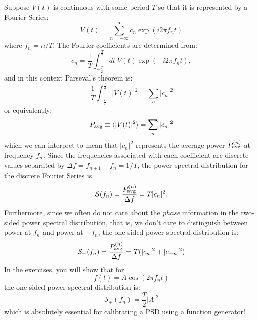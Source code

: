 \documentclass[12pt]{article}
\begin{document}
Suppose $V(t)$ is continuous with some period $T$ so that it is represented by a Fourier Series:
\begin{displaymath}
V(t) = \sum_{n=-\infty}^{\infty} c_n \exp(i2\pi f_n t)
\end{displaymath}
where $f_n = n / T$.  The Fourier coefficients are determined from:
\begin{equation}
c_n = \frac{1}{T} \int_{-\frac{T}{2}}^{\frac{T}{2}} dt \; V(t) \exp(-i2\pi f_n t), \label{eqn:freqcoeff}
\end{equation}
and in this context Parseval's theorem is:
\begin{displaymath}
\frac{1}{T} \int_{-\frac{T}{2}}^{\frac{T}{2}} |V(t)|^2 = \sum_n |c_n|^2
\end{displaymath}
or equivalently:
\begin{displaymath}
P_{\rm avg} \equiv \braket{|V(t)|^2} = \sum_n |c_n|^2
\end{displaymath}
which we can interpret to mean that $|c_n|^2$ represents the average power $P_{\rm avg}^{(n)}$ at frequency $f_n$.  Since the frequencies associated with each coefficient are discrete values separated by $\Delta f = f_{n+1} - f_{n} = 1/T $, the power spectral distribution for the discrete Fourier Series is
\begin{displaymath}
\mathcal{S}(f_n) = \frac{P_{\rm avg}^{(n)}}{\Delta f} = T |c_n|^2.
\end{displaymath}
Furthermore, since we often do not care about the {\em phase} information in the two-sided power spectral distribution, that is, we don't care to distinguish between power at $f_n$ and power at $-f_n$, the one-sided power spectral distribution is:
\begin{equation}
\mathcal{S}_{+}(f_n) = \frac{P_{\rm avg}^{(n)}}{\Delta f} = T (|c_n|^2 + |c_{-n}|^2) \label{eqn:discretepsd}
\end{equation}
In the exercises, you will show that for
\begin{displaymath}
f(t) = A \cos( 2 \pi f_n t)
\end{displaymath}
the one-sided power spectral distribution is:
\begin{equation}
\mathcal{S}_{+}(f_n) = \frac{T}{2} |A|^2 \label{eqn:psdcalib}
\end{equation}
which is absolutely essential for calibrating a PSD using a function generator!

%
%
\end{document}
